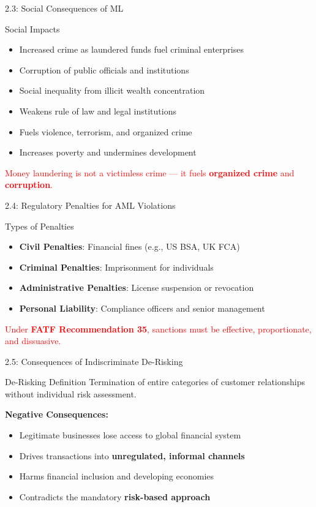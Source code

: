 \documentclass{beamer}
\begin{document}
	\begin{frame}{2.3: Social Consequences of ML}
		\begin{block}{Social Impacts}
			\begin{itemize}
				\item Increased crime as laundered funds fuel criminal enterprises
				\item Corruption of public officials and institutions
				\item Social inequality from illicit wealth concentration
				\item Weakens rule of law and legal institutions
				\item Fuels violence, terrorism, and organized crime
				\item Increases poverty and undermines development
			\end{itemize}
		\end{block}
		\textcolor{red}{Money laundering is not a victimless crime — it fuels \textbf{organized crime} and \textbf{corruption}.}
	\end{frame}
	
	\begin{frame}{2.4: Regulatory Penalties for AML Violations}
		\begin{block}{Types of Penalties}
			\begin{itemize}
				\item \textbf{Civil Penalties}: Financial fines (e.g., US BSA, UK FCA)
				\item \textbf{Criminal Penalties}: Imprisonment for individuals
				\item \textbf{Administrative Penalties}: License suspension or revocation
				\item \textbf{Personal Liability}: Compliance officers and senior management
			\end{itemize}
		\end{block}
		\textcolor{red}{Under \textbf{FATF Recommendation 35}, sanctions must be effective, proportionate, and dissuasive.}
	\end{frame}
	
	\begin{frame}{2.5: Consequences of Indiscriminate De-Risking}
		\begin{block}{De-Risking Definition}
			Termination of entire categories of customer relationships without individual risk assessment.
		\end{block}
		\textbf{Negative Consequences:}
		\begin{itemize}
			\item Legitimate businesses lose access to global financial system
			\item Drives transactions into \textbf{unregulated, informal channels}
			\item Harms financial inclusion and developing economies
			\item Contradicts the mandatory \textbf{risk-based approach}
		\end{itemize}
	\end{frame}
	
\end{document}
